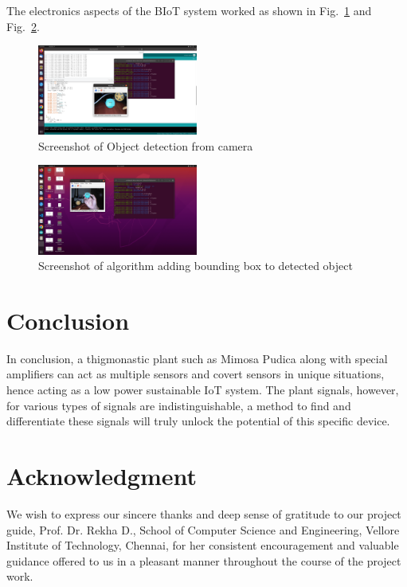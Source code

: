 \documentclass[conference]{IEEEtran}
\begin{document}
The electronics aspects of the BIoT system worked as shown in Fig.~\ref{fig:obj} and Fig.~\ref{pixy}.
\begin{figure}[H]
    \begin{center}
        \includegraphics[width=0.47\textwidth]{objdet}
    \end{center}
    \caption{Screenshot of Object detection from camera}\label{fig:obj}
\end{figure}

\begin{figure}[H]
    \begin{center}
        \includegraphics[width=0.47\textwidth]{pixy}
    \end{center}
    \caption{Screenshot of algorithm adding bounding box to detected object}\label{pixy}
\end{figure}


\section{Conclusion}
In conclusion, a thigmonastic plant such as Mimosa Pudica along with 
special amplifiers can act as multiple sensors and covert sensors in 
unique situations, hence acting as a low power sustainable IoT system.
The plant signals, however, for various types of signals are 
indistinguishable, a method to find and differentiate these signals
will truly unlock the potential of this specific device. 



\section*{Acknowledgment}

We wish to express our sincere thanks and deep sense of gratitude to our 
project guide, Prof. Dr. Rekha D., School of Computer Science and Engineering,
Vellore Institute of Technology, Chennai, for her consistent encouragement
and valuable guidance offered to us in a pleasant manner throughout the 
course of the project work. 
\end{document}
